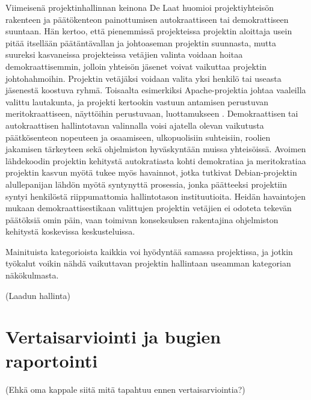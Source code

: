\documentclass[utf8]{gradu3}
\begin{document}
Viimeisenä projektinhallinnan keinona De Laat huomioi projektiyhteisön
rakenteen ja päätökenteon painottumisen autokraattiseen tai demokrattiseen
suuntaan. Hän kertoo, että pienemmissä projekteissa projektin aloittaja usein
pitää itsellään päätäntävallan ja johtoaseman projektin suunnasta, mutta
suureksi kasvaneissa projekteissa vetäjien valinta voidaan hoitaa
demokraattisemmin, jolloin yhteisön jäsenet voivat vaikuttaa projektin
johtohahmoihin. Projektin vetäjäksi voidaan valita yksi henkilö tai useasta
jäsenestä koostuva ryhmä. Toisaalta esimerkiksi Apache-projektia johtaa
vaaleilla valittu lautakunta, ja projekti kertookin vastuun antamisen
perustuvan meritokraattiseen, näyttöihin perustuvaan, luottamukseen \parencite{Apache-2021}.
Demokraattisen tai autokraattisen hallintotavan valinnalla voisi ajatella
olevan vaikutusta päätkösenteon nopeuteen ja osaamiseen, ulkopuolisiin
suhteisiin, roolien jakamisen tärkeyteen sekä ohjelmiston hyväskyntään muissa
yhteisöissä. Avoimen lähdekoodin projektin kehitystä autokratiasta kohti
demokratiaa ja meritokratiaa projektin kasvun myötä tukee myös
\textcite{OMahony-2007b} havainnot, jotka tutkivat Debian-projektin alullepanijan
lähdön myötä syntynyttä prosessia, jonka päätteeksi projektiin syntyi henkilöstä
riippumattomia hallintotason instituutioita. Heidän havaintojen mukaan
demokraattisestikaan valittujen projektin vetäjien ei odoteta tekevän
päätöksiä omin päin, vaan toimivan konseksuksen rakentajina ohjelmiston
kehitystä koskevissa keskusteluissa.

Mainituista kategorioista kaikkia voi hyödyntää samassa projektissa, ja jotkin
työkalut voikin nähdä vaikuttavan projektin hallintaan useamman kategorian
näkökulmasta.



(Laadun hallinta)

\section{Vertaisarviointi ja bugien raportointi}
 (Ehkä oma kappale siitä mitä tapahtuu ennen vertaisarviointia?)
\end{document}
